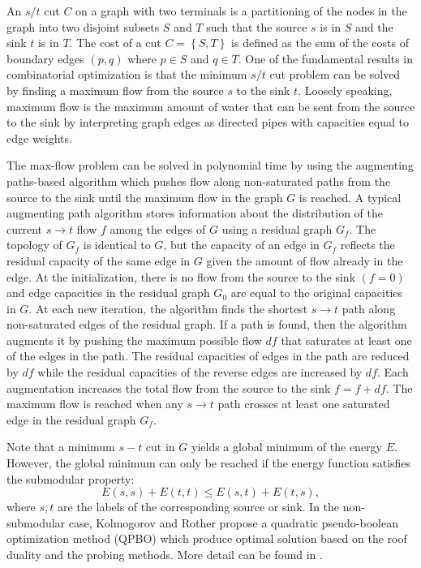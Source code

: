 \documentclass{SMBV12}
\begin{document}
An $s/t$ cut $C$ on a graph with two terminals is a partitioning of the nodes in the graph into two disjoint subsets $S$ and $T$ such that the source $s$ is in $S$ and the sink $t$ is in $T$. The cost of a cut $C = \left\lbrace S, T \right\rbrace $ is defined as the sum of the costs of boundary edges $(p, q)$ where $p \in S$ and $q \in T$. One of the fundamental results in combinatorial optimization is that the minimum $s/t$ cut problem can be solved by finding a maximum flow from the source $s$ to the sink $t$. Loosely speaking, maximum flow is the maximum amount of water that can be sent from the source to the sink by interpreting graph edges as directed pipes with capacities equal to edge weights.

The max-flow problem can be solved in polynomial time by using the augmenting paths-based algorithm which pushes flow along non-saturated paths from the source to the sink until the maximum flow in the graph $G$ is reached. A typical augmenting path algorithm stores information about the distribution of the current $s \rightarrow t$ flow $f$ among the edges of $G$ using a residual graph $G_f$. The topology of $G_f$ is identical to $G$, but the capacity of an edge in $G_f$ reflects the residual capacity of the same edge in $G$ given the amount of flow already in the edge. At the initialization, there is no flow from the source to the sink $(f = 0)$ and edge capacities in the residual graph $G_0$ are equal to the original capacities in $G$. At each new
iteration, the algorithm finds the shortest $s \rightarrow t$ path along non-saturated edges of the residual graph. If a path is found, then the algorithm augments it by pushing the maximum possible flow $df$ that saturates at least one of the edges in the path. The residual capacities of edges in the path are reduced
by $df$ while the residual capacities of the reverse edges are increased by $df$. Each augmentation increases the total flow from the source to the sink $f = f + df$. The maximum flow is reached when any $s \rightarrow t$ path crosses at least one saturated edge in the residual graph $G_f$.

Note that a minimum $s-t$ cut in $G$ yields a global minimum of the energy $E$. However, the global minimum can only be reached if the energy function satisfies the submodular property:
\begin{equation}
E(s, s) + E(t,t) \leq E(s,t) + E(t, s),
\end{equation}
where $s, t$ are the labels of the corresponding source or sink. In the non-submodular case, Kolmogorov and Rother propose a quadratic pseudo-boolean optimization method (QPBO) which produce optimal solution based on the roof duality and the probing methods. More detail can be found in \cite{kolmogorov2007minimizing}.
\end{document}
